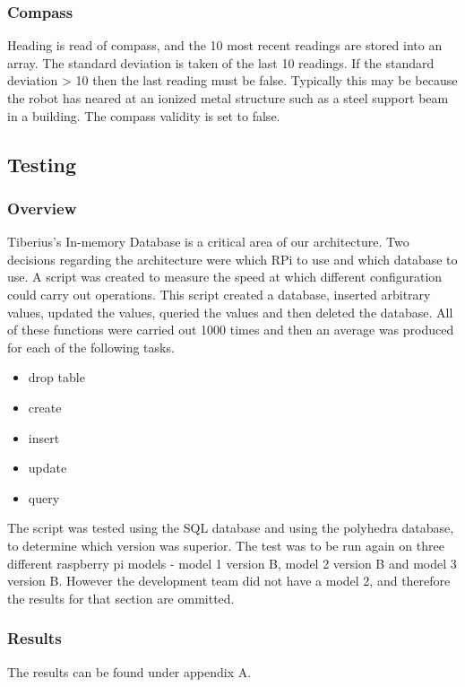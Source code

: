 \subsubsection{Compass}
Heading is read of compass, and the 10 most recent readings are stored into an array. 
The standard deviation is taken of the last 10 readings. 
If the standard deviation > 10 then the last reading must be false. Typically this may be because the robot has neared at an ionized metal structure such as a steel support beam in a building. 
The compass validity is set to false.



\subsection{Testing}
\subsubsection{Overview}
Tiberius's In-memory Database is a critical area of our architecture. Two decisions regarding the architecture were which RPi to use and which database to use. A script was created to measure the speed at which different configuration could carry out operations. This script created a database, inserted arbitrary values, updated the values, queried the  values and then deleted the database. All of these functions were carried out 1000 times and then an average was produced for each of the following tasks.
\begin{itemize}
\item drop table
\item create
\item insert
\item update
\item query
\end{itemize}

The script was tested using the SQL database and using the polyhedra database, to determine which version was superior. The test was to be run again on three different raspberry pi models - model 1 version B, model 2 version B and model 3 version B. However the development team did not have a model 2, and therefore the results for that section are ommitted. 

\subsubsection{Results}
The results can be found under appendix A.

